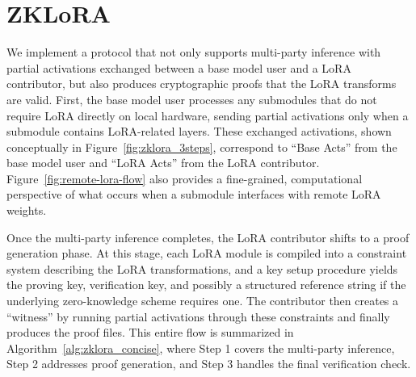 \documentclass[11pt]{article}
\begin{document}
\section{ZKLoRA}
We implement a protocol that not only supports multi-party inference with partial activations exchanged between a base model user and a LoRA contributor, but also produces cryptographic proofs that the LoRA transforms are valid. First, the base model user processes any submodules that do not require LoRA directly on local hardware, sending partial activations only when a submodule contains LoRA-related layers. These exchanged activations, shown conceptually in Figure~\ref{fig:zklora_3steps}, correspond to “Base Acts” from the base model user and “LoRA Acts” from the LoRA contributor. Figure~\ref{fig:remote-lora-flow} also provides a fine-grained, computational perspective of what occurs when a submodule interfaces with remote LoRA weights.

Once the multi-party inference completes, the LoRA contributor shifts to a proof generation phase. At this stage, each LoRA module is compiled into a constraint system describing the LoRA transformations, and a key setup procedure yields the proving key, verification key, and possibly a structured reference string if the underlying zero-knowledge scheme requires one. The contributor then creates a “witness” by running partial activations through these constraints and finally produces the proof files. This entire flow is summarized in Algorithm~\ref{alg:zklora_concise}, where Step 1 covers the multi-party inference, Step 2 addresses proof generation, and Step 3 handles the final verification check.
\end{document}

